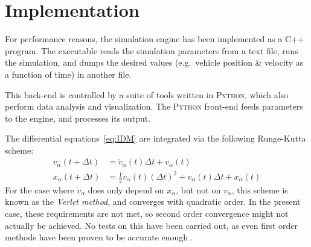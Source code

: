 \section{Implementation}
For performance reasons, the simulation engine has been implemented as a \textsc{C++} program. The executable reads the simulation parameters from a text file, runs the simulation, and dumps the desired values (e.g.\ vehicle position \& velocity as a function of time) in another file.

This back-end is controlled by a suite of tools written in \textsc{Python}, which also perform data analysis and visualization. The \textsc{Python} front-end feeds parameters to the engine, and processes its output.

The differential equations~\eqref{eq:IDM} are integrated via the following Runge-Kutta scheme:
\begin{align*}
v_\alpha(t+\Delta t) &= \dot v_\alpha(t)\Delta t+v_\alpha(t) \\
x_\alpha(t+\Delta t) &= \frac{1}{2}\dot v_\alpha(t) (\Delta t)^2 + v_\alpha(t)\Delta t + x_\alpha(t)
\end{align*}
For the case where $\dot v_\alpha$ does only depend on $x_\alpha$, but not on $v_\alpha$, this scheme is known as the \emph{Verlet method}, and converges with quadratic order. In the present case, these requirements are not met, so second order convergence might not actually be achieved. No tests on this have been carried out, as even first order methods have been proven to be accurate enough \cite{treiber2015}.
